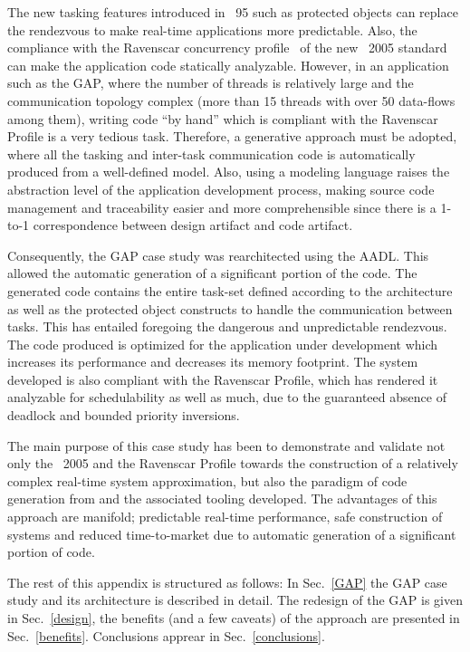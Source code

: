 The new tasking features introduced in \ada~95 such as protected
objects can replace the rendezvous to make real-time applications more
predictable. Also, the compliance with the Ravenscar concurrency
profile~\cite{burns@adalett04} of the new \ada~2005 standard can make the
application code statically analyzable. However, in an application
such as the GAP, where the number of threads is relatively large and
the communication topology complex (more than 15 threads with over 50
data-flows among them), writing code ``by hand'' which is compliant
with the Ravenscar Profile is a very tedious task. Therefore, a
generative approach must be adopted, where all the tasking and
inter-task communication code is automatically produced from a
well-defined model. Also, using a modeling language raises the
abstraction level of the application development process, making
source code management and traceability easier and more comprehensible
since there is a 1-to-1 correspondence between design artifact and
code artifact.

Consequently, the GAP case study was rearchitected using the
AADL. This allowed the automatic generation of a significant portion
of the code. The generated code contains the entire task-set defined
according to the architecture as well as the \ada protected object
constructs to handle the communication between tasks. This has
entailed foregoing the dangerous and unpredictable rendezvous. The
code produced is optimized for the application under development which
increases its performance and decreases its memory footprint. The
system developed is also compliant with the Ravenscar Profile, which
has rendered it analyzable for schedulability as well as much, due to
the guaranteed absence of deadlock and bounded priority inversions.

The main purpose of this case study has been to demonstrate and
validate not only the \ada~2005 and the Ravenscar Profile towards the
construction of a relatively complex real-time system approximation,
but also the paradigm of code generation from \aadl and the associated
tooling developed. The advantages of this approach are manifold;
predictable real-time performance, safe construction of systems and
reduced time-to-market due to automatic generation of a significant
portion of code.

The rest of this appendix is structured as follows: In
Sec.~\ref{GAP} the GAP case study and its architecture is described
in detail. The redesign of the GAP is given in Sec.~\ref{design},
the benefits (and a few caveats) of the approach are presented in
Sec.~\ref{benefits}. Conclusions apprear in Sec.~\ref{conclusions}.

